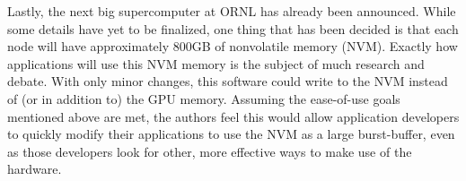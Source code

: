 Lastly, the next big supercomputer at ORNL has already been announced.  While some details have yet to be finalized, one thing that has been decided is that each node will have approximately 800GB of nonvolatile memory (NVM).\cite{summit_page}  
Exactly how applications will use this NVM memory is the subject of much research and debate. With only minor changes, this software could write to the NVM instead of (or in addition to) the GPU memory.  Assuming the ease-of-use goals mentioned above are met, the authors feel this would allow application developers to quickly modify their applications to use the NVM as a large burst-buffer, even as those developers look for other, more effective ways to make use of the hardware.

